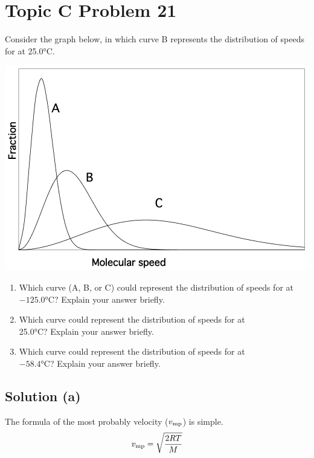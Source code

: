 \documentclass[10pt]{article}
\begin{document}
    \section{Topic C Problem 21}
        Consider the graph below, in which curve B represents the distribution of speeds for  at 25.0\unit{\celsius}.
        \begin{center}
            \includegraphics[width=\textwidth]{picture_C-21.png}
        \end{center}

        \begin{enumerate} [label=\alph*)]
            \item Which curve (A, B, or C) could represent the distribution of speeds for  at $-125.0\unit{\celsius}$? Explain your answer briefly.
            \item Which curve could represent the distribution of speeds for  at \\25.0\unit{\celsius}? Explain your answer briefly.
            \item Which curve could represent the distribution of speeds for  at \\$-58.4\unit{\celsius}$? Explain your answer briefly.
        \end{enumerate}

        \subsection{Solution (a)}
            The formula of the most probably velocity ($v_{\rm mp}$) is simple.
            \begin{equation}
                v_{\rm mp}  =   \sqrt{\frac{2RT}{M}}
            \end{equation}
\end{document}
